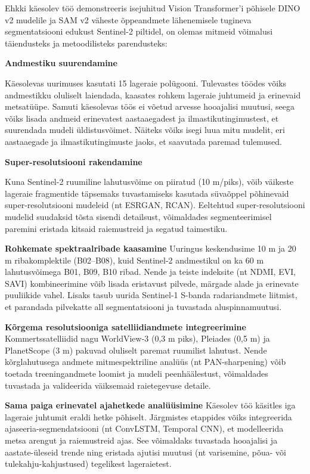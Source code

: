 Ehkki käesolev töö demonstreeris isejuhitud Vision Transformer'i põhisele DINO
v2 mudelile ja SAM v2 väheste õppeandmete lähenemisele tugineva segmentatsiooni
edukust Sentinel-2 piltidel, on olemas mitmeid võimalusi täiendusteks ja
metoodilisteks parendusteks:

\textbf{Andmestiku suurendamine}

Käesolevas uurimuses kasutati 15 lageraie polügooni. Tulevastes töödes võiks
andmestikku oluliselt laiendada, kaasates rohkem lageraie juhtumeid ja
erinevaid metsatüüpe. Samuti käesolevas töös ei võetud arvesse hooajalisi
muutusi, seega võiks lisada andmeid erinevatest aastaaegadest ja ilmastikutingimustest,
et suurendada mudeli üldistusvõimet. Näiteks võiks isegi luua mitu mudelit, eri aastaaegade ja ilmastikutingimuste jaoks, et saavutada paremad tulemused.

\textbf{Super-resolutsiooni rakendamine} 

Kuna Sentinel-2 ruumiline lahutusvõime on
piiratud (10 m/piks), võib väikeste lageraie fragmentide täpsemaks tuvastamiseks
kasutada süvaõppel põhinevaid super-resolutsiooni mudeleid (nt ESRGAN, RCAN).
Eeltehtud super-resolutsiooni mudelid suudaksid tõsta sisendi detailsust,
võimaldades segmenteerimisel paremini eristada kitsaid raiemustreid ja segatud
taimestiku.

\textbf{Rohkemate spektraalribade kaasamine} 
Uuringus keskendusime 10 m ja 20 m
riba­komplektile (B02--B08), kuid Sentinel-2 andmestikul on ka 60 m
lahutusvõimega B01, B09, B10 ribad. Nende ja teiste indeksite (nt NDMI, EVI,
SAVI) kombineerimine võib lisada eristavust pilvede, märgade alade ja erinevate
puuliikide vahel. Lisaks tasub uurida Sentinel-1 S-banda radariandmete liitmist,
et parandada pilvekatte all segmentatsiooni ja tuvastada aluspinnamuutusi.

\textbf{Kõrgema resolutsiooniga satelliidiandmete integreerimine}
 Kommertssatelliidid
nagu WorldView-3 (0,3 m piks), Pleiades (0,5 m) ja PlanetScope (3 m) pakuvad
oluliselt paremat ruumilist lahutust. Nende kõrglahutusega andmete
mitmespektriline analüüs (nt PAN-sharpening) võib toetada treeningandmete
loomist ja mudeli peenhäälestust, võimaldades tuvastada ja valideerida
väiksemaid raietegevuse detaile.

\textbf{Sama paiga erinevatel ajahetkede analüüsimine} 
Käesolev töö käsitles iga lageraie juhtumit
eraldi hetke põhiselt. Järgmistes etappides võiks integreerida
ajaseeria-segmendatsiooni (nt ConvLSTM, Temporal CNN), et modelleerida metsa
arengut ja raiemustreid ajas. See võimaldaks tuvastada hooajalisi ja
aastate-üleseid trende ning eristada ajutisi muutusi (nt varisemine, põua- või
tulekahju-kahjustused) tegelikest lageraietest.

